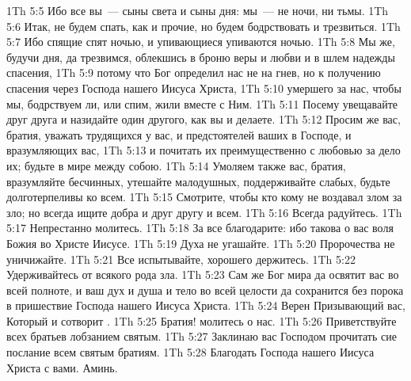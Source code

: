 \vs 1Th 5:5 Ибо все вы~--- сыны света и сыны дня: мы~--- не  ночи, ни тьмы.
\vs 1Th 5:6 Итак, не будем спать, как и прочие, но будем бодрствовать и трезвиться.
\vs 1Th 5:7 Ибо спящие спят ночью, и упивающиеся упиваются ночью.
\vs 1Th 5:8 Мы же, будучи  дня, да трезвимся, облекшись в броню веры и любви и в шлем надежды спасения,
\vs 1Th 5:9 потому что Бог определил нас не на гнев, но к получению спасения через Господа нашего Иисуса Христа,
\vs 1Th 5:10 умершего за нас, чтобы мы, бодрствуем ли, или спим, жили вместе с Ним.
\vs 1Th 5:11 Посему увещавайте друг друга и назидайте один другого, как вы и делаете.
\rsbpar\vs 1Th 5:12 Просим же вас, братия, уважать трудящихся у вас, и предстоятелей ваших в Господе, и вразумляющих вас,
\vs 1Th 5:13 и почитать их преимущественно с любовью за дело их; будьте в мире между собою.
\vs 1Th 5:14 Умоляем также вас, братия, вразумляйте бесчинных, утешайте малодушных, поддерживайте слабых, будьте долготерпеливы ко всем.
\vs 1Th 5:15 Смотрите, чтобы кто кому не воздавал злом за зло; но всегда ищите добра и друг другу и всем.
\vs 1Th 5:16 Всегда радуйтесь.
\vs 1Th 5:17 Непрестанно молитесь.
\vs 1Th 5:18 За все благодарите: ибо такова о вас воля Божия во Христе Иисусе.
\vs 1Th 5:19 Духа не угашайте.
\vs 1Th 5:20 Пророчества не уничижайте.
\vs 1Th 5:21 Все испытывайте, хорошего держитесь.
\vs 1Th 5:22 Удерживайтесь от всякого рода зла.
\vs 1Th 5:23 Сам же Бог мира да освятит вас во всей полноте, и ваш дух и душа и тело во всей целости да сохранится без порока в пришествие Господа нашего Иисуса Христа.
\vs 1Th 5:24 Верен Призывающий вас, Который и сотворит .
\vs 1Th 5:25 Братия! молитесь о нас.
\rsbpar\vs 1Th 5:26 Приветствуйте всех братьев лобзанием святым.
\vs 1Th 5:27 Заклинаю вас Господом прочитать сие послание всем святым братиям.
\rsbpar\vs 1Th 5:28 Благодать Господа нашего Иисуса Христа с вами. Аминь.
